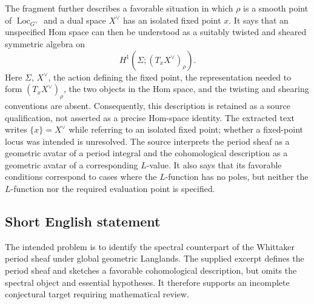 \documentclass[11pt]{article}
\begin{document}
The fragment further describes a favorable situation in which \(\rho\) is a smooth point of \(\operatorname{Loc}_{G^\vee}\) and a dual space \(X^\vee\) has an isolated fixed point \(x\). It says that an unspecified Hom space can then be understood as a suitably twisted and sheared symmetric algebra on
\[
H^1\!\left(\Sigma;(T_xX^\vee)_\rho\right).
\]
Here \(\Sigma\), \(X^\vee\), the action defining the fixed point, the representation needed to form \((T_xX^\vee)_\rho\), the two objects in the Hom space, and the twisting and shearing conventions are absent. Consequently, this description is retained as a source qualification, not asserted as a precise Hom-space identity. The extracted text writes \(\{x\}=X^\vee\) while referring to an isolated fixed point; whether a fixed-point locus was intended is unresolved. The source interprets the period sheaf as a geometric avatar of a period integral and the cohomological description as a geometric avatar of a corresponding \(L\)-value. It also says that its favorable conditions correspond to cases where the \(L\)-function has no poles, but neither the \(L\)-function nor the required evaluation point is specified.
\subsection{Short English statement}
The intended problem is to identify the spectral counterpart of the Whittaker period sheaf under global geometric Langlands. The supplied excerpt defines the period sheaf and sketches a favorable cohomological description, but omits the spectral object and essential hypotheses. It therefore supports an incomplete conjectural target requiring mathematical review.
\end{document}
